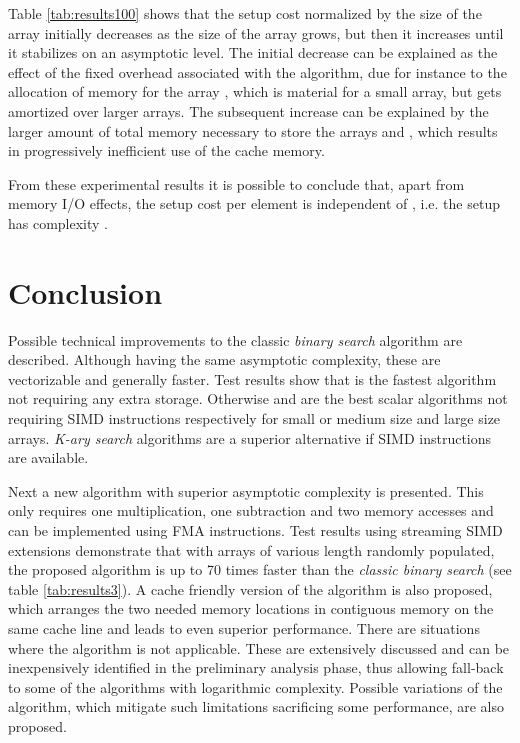 \documentclass[preprint,1p,times]{elsarticle}
\begin{document}
Table \ref{tab:results100} shows that the setup cost normalized by the size of the array  initially decreases as the size of the array  grows, but then it increases until it stabilizes on an asymptotic level.
The initial decrease can be explained as the effect of the fixed overhead associated with the algorithm, due for instance to the allocation of memory for the array , which is material for a small array, but gets amortized over larger arrays. 
The subsequent increase can be explained by the larger amount of total memory necessary to store the arrays  and , which results in progressively inefficient use of the cache memory.

From these experimental results it is possible to conclude that, apart from memory I/O effects, the setup cost per element is independent of , i.e. the setup has complexity .




\section{Conclusion}
Possible technical improvements to the classic \textit{binary search} algorithm are described. Although having the same asymptotic complexity, these are vectorizable and generally faster. Test results show that \textit{\ClassicOffsetName} is the fastest algorithm not requiring any extra storage. Otherwise \textit{\BitSetName} and \textit{\EytzingerName} are the best scalar algorithms not requiring SIMD instructions respectively for small or medium size and large size arrays. \textit{K-ary search} algorithms are a superior alternative if SIMD instructions are available.

Next a new algorithm with superior asymptotic complexity is presented. This only requires one multiplication, one subtraction and two memory accesses and can be implemented using FMA instructions. Test results using streaming SIMD extensions demonstrate that with arrays  of various length randomly populated, the proposed algorithm is up to 70 times faster than the \textit{classic binary search} (see table \ref{tab:results3}). A cache friendly version of the algorithm is also proposed, which arranges the two needed memory locations in contiguous memory on the same cache line and leads to even superior performance. There are situations where the algorithm is not applicable. These are extensively discussed and can be inexpensively identified in the preliminary analysis phase, thus allowing fall-back to some of the algorithms with logarithmic complexity. Possible variations of the algorithm, which mitigate such limitations sacrificing some performance, are also proposed.
\end{document}
